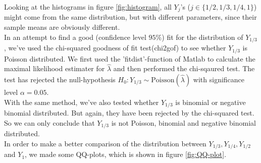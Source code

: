 Looking at the histograms in figure \ref{fig:histogram}, all $Y_j$'s ($j\in \{1/2,1/3,1/4,1\}$) might come from the same distribution, but with different parameters, since their sample means are obviously different.\\
In an attempt to find a good (confidence level $95\%$) fit for the distribution of $Y_{1/3}$, we've used the chi-squared goodness of fit test(chi2gof) to see whether $Y_{1/3}$ is Poisson distributed. 
We first used the 'fitdist'-function of Matlab to calculate the maximal likelihood estimater for $\hat{\lambda}$ and then performed the chi-sqaured test. 
The test has rejected the null-hypothesis $H_0:Y_{1/3}\sim\text{Poisson}(\hat{\lambda})$ with significance level $\alpha=0.05$.\\   

With the same method, we've also tested whether $Y_{1/3}$ is binomial or negative binomial distributed. 
But again, they have been rejected by the chi-squared test. 
So we can only conclude that $Y_{1/3}$ is not Poisson, binomial and negative binomial distributed.\\

In order to make a better comparison of the distribution between $Y_{1/3},Y_{1/4},Y_{1/2}$ and $Y_1$, we made some QQ-plots, which is shown in figure \ref{fig:QQ-plot}.
 

